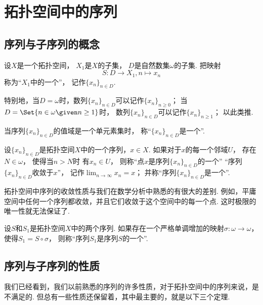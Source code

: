 \section{拓扑空间中的序列}
\subsection{序列与子序列的概念}
\begin{definition}
设\(X\)是一个拓扑空间，
\(X_1\)是\(X\)的子集，
\(D\)是自然数集\(\omega\)的子集.
把映射\[
	S\colon D \to X_1, n \mapsto x_n
\]称为“\(X_1\)中的一个”，
记作\(\{x_n\}_{n \in D}\).
\end{definition}

特别地，当\(D = \omega\)时，数列\(\{x_n\}_{n \in D}\)可以记作\(\{x_n\}_{n\geq0}\)；
当\(D = \Set{ n \in \omega \given n \geq 1}\)时，
数列\(\{x_n\}_{n \in D}\)可以记作\(\{x_n\}_{n\geq1}\)；
以此类推.

当序列\(\{x_n\}_{n \in D}\)的值域是一个单元素集时，
称“\(\{x_n\}_{n \in D}\)是一个”.

\begin{definition}
设\(\{x_n\}_{n \in D}\)是拓扑空间\(X\)中的一个序列，\(x \in X\).
如果对于\(x\)的每一个邻域\(U\)，
存在\(N \in \omega\)，
使得当\(n > N\)时
有\(x_n \in U\)，
则称“点\(x\)是序列\(\{x_n\}_{n \in D}\)的一个”
“序列\(\{x_n\}_{n \in D}\)收敛于\(x\)”，
记作\(\lim_{n\to\infty} x_n = x\)；
并称“序列\(\{x_n\}_{n \in D}\)是一个”.
\end{definition}

拓扑空间中序列的收敛性质与我们在数学分析中熟悉的有很大的差别.
例如，平庸空间中任何一个序列都收敛，并且它们收敛于这个空间中的每一个点.
这时极限的唯一性就无法保证了.

\begin{definition}\label{definition:序列.子序列}
设\(S\)和\(S_1\)是拓扑空间\(X\)中的两个序列.
如果存在一个严格单调增加的映射\(\sigma\colon \omega \to \omega\)，
使得\(S_1 = S \circ \sigma\)，
则称“序列\(S_1\)是序列\(S\)的一个”.
\end{definition}

\subsection{序列与子序列的性质}
我们已经看到，我们以前熟悉的序列的许多性质，对于拓扑空间中的序列来说，是不满足的.
但总有一些性质还保留着，其中最主要的，就是以下三个定理.

